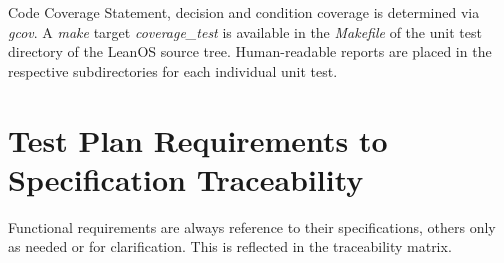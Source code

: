 {Code Coverage}{%
Statement, decision and condition coverage is determined via \emph{gcov}.
A \emph{make} target \emph{coverage\_test} is available in the \emph{Makefile}
of the unit test directory of the LeanOS source tree.
Human-readable reports are placed in the respective subdirectories for each
individual unit test.
}%
{}{}



\chapter{Test Plan Requirements to Specification Traceability}

\noindent
Functional requirements are always reference to their specifications, others
only as needed or for clarification. This is reflected in the traceability
matrix.

\traceabilitymatrix


